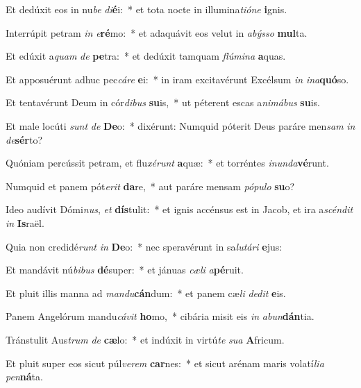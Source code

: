 \item Et dedúxit eos in nu\textit{be} \textit{di}\textbf{é}i:~* et tota nocte in illumina\textit{ti}\textit{ó}\textit{ne} \textbf{i}gnis.
\item Interrúpit petram \textit{in} \textit{e}\textbf{ré}mo:~* et adaquávit eos velut in \textit{a}\textit{býs}\textit{so} \textbf{mul}ta.
\item Et edúxit a\textit{quam} \textit{de} \textbf{pe}tra:~* et dedúxit tamquam \textit{flú}\textit{mi}\textit{na} \textbf{a}quas.
\item Et apposuérunt adhuc pec\textit{cá}\textit{re} \textbf{e}i:~* in iram excitavérunt Excélsum \textit{in} \textit{in}\textit{a}\textbf{quó}so.
\item Et tentavérunt Deum in cór\textit{di}\textit{bus} \textbf{su}is,~* ut péterent escas a\textit{ni}\textit{má}\textit{bus} \textbf{su}is.
\item Et male locúti \textit{sunt} \textit{de} \textbf{De}o:~* dixérunt: Numquid póterit Deus paráre men\textit{sam} \textit{in} \textit{de}\textbf{sér}to?
\item Quóniam percússit petram, et flu\textit{xé}\textit{runt} \textbf{a}quæ:~* et torréntes \textit{in}\textit{un}\textit{da}\textbf{vé}runt.
\item Numquid et panem pót\textit{e}\textit{rit} \textbf{da}re,~* aut paráre mensam \textit{pó}\textit{pu}\textit{lo} \textbf{su}o?
\item Ideo audívit Dómi\textit{nus}, \textit{et} \textbf{dís}tulit:~* et ignis accénsus est in Jacob, et ira a\textit{scén}\textit{dit} \textit{in} \textbf{Is}raël.
\item Quia non credidé\textit{runt} \textit{in} \textbf{De}o:~* nec speravérunt in sa\textit{lu}\textit{tá}\textit{ri} \textbf{e}jus:
\item Et mandávit nú\textit{bi}\textit{bus} \textbf{dé}super:~* et jánuas \textit{cæ}\textit{li} \textit{a}\textbf{pé}ruit.
\item Et pluit illis manna ad \textit{man}\textit{du}\textbf{cán}dum:~* et panem cæ\textit{li} \textit{de}\textit{dit} \textbf{e}is.
\item Panem Angelórum mandu\textit{cá}\textit{vit} \textbf{ho}mo,~* cibária misit eis \textit{in} \textit{ab}\textit{un}\textbf{dán}tia.
\item Tránstulit Aus\textit{trum} \textit{de} \textbf{cæ}lo:~* et indúxit in virtú\textit{te} \textit{su}\textit{a} \textbf{A}fricum.
\item Et pluit super eos sicut púl\textit{ve}\textit{rem} \textbf{car}nes:~* et sicut arénam maris volatí\textit{li}\textit{a} \textit{pen}\textbf{ná}ta.
